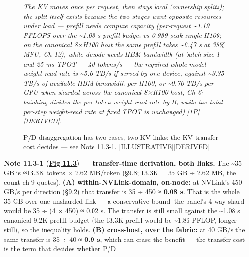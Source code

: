 \begin{figure}
\end{figure}\begin{figure}
\centering
{}
\caption[P/D disaggregation has two cases, two KV links]{P/D disaggregation has two cases, two KV links; the KV-transfer cost decides --- see Note 11.3-1. \mbox{{[}ILLUSTRATIVE{]}}\hspace{0pt}\mbox{{[}DERIVED{]}}}

\label{fig:11.3}\emph{The KV moves once per request, then stays local (ownership
splits); the split itself exists because the two stages want opposite
resources under load --- prefill needs compute capacity (per-request
\textasciitilde1.19 PFLOPS over the \textasciitilde1.08 s prefill budget
vs 0.989 peak single-H100; on the canonical 8×H100 host the same prefill
takes \textasciitilde0.47 s at 35\% MFU, Ch 12), while decode needs HBM
bandwidth (at batch size 1 and 25 ms TPOT --- 40 tokens/s --- the
required whole-model weight-read rate is \textasciitilde5.6 TB/s if
served by one device, against \textasciitilde3.35 TB/s of available HBM
bandwidth per H100, or \textasciitilde0.70 TB/s per GPU when sharded
across the canonical 8×H100 host, Ch 6; batching divides the per-token
weight-read rate by B, while the total per-step weight-read rate at
fixed TPOT is unchanged) \mbox{{[}1P{]}}\hspace{0pt}\mbox{{[}DERIVED{]}}.}

\end{figure}\textbf{Note 11.3-1 (\hyperref[fig:11.3]{Fig 11.3}) --- transfer-time derivation, both
links.} The \textasciitilde35 GB is ≈13.3K tokens × 2.62 MB/token (§9.8;
13.3K = 35 GB ÷ 2.62 MB, the count ch 9 quotes). \textbf{(A)
within-NVLink-domain, on-node:} at NVLink's 450 GB/s per direction
(§9.2) that transfer is 35 ÷ 450 ≈ \textbf{0.08 s}. That is the whole 35
GB over one unsharded link --- a conservative bound; the panel's 4-way
shard would be 35 ÷ (4 × 450) ≈ 0.02 s. The transfer is still small
against the \textasciitilde1.08 s canonical 9.2K prefill budget (the
13.3K prefill would be \textasciitilde1.86 PFLOP, longer still), so the
inequality holds. \textbf{(B) cross-host, over the fabric:} at 40 GB/s
the same transfer is 35 ÷ 40 ≈ \textbf{0.9 s}, which can erase the
benefit --- the transfer cost is the term that decides whether P/D
